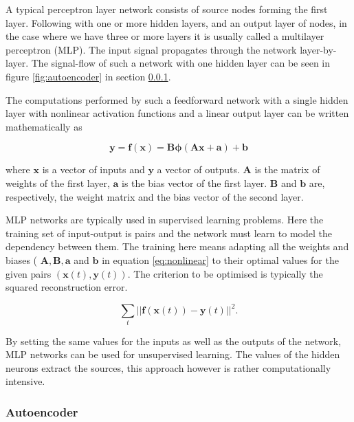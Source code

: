 A typical perceptron layer network consists of source nodes forming the first layer. Following with one or more hidden layers, and an output layer of nodes, in the case where we have three or more layers it is usually called a multilayer perceptron (MLP). The input signal propagates through the network layer-by-layer. The signal-flow of such a network with one hidden layer can be seen in figure \ref{fig:autoencoder} in section \ref{sec:autoencoders}.

The computations performed by such a feedforward network with a single hidden layer with nonlinear activation functions and a linear output layer can be written mathematically as

\begin{equation}
\mathbf{y}= \mathbf{f}(\mathbf{x}) = \mathbf{B}\boldsymbol{\phi}( \mathbf{A}\mathbf{x}+ \mathbf{a} ) + \mathbf{b}
\label{eq:nonlinear}
\end{equation}

where  $\mathbf{x}$ is a vector of inputs and  $\mathbf{y}$ a vector of outputs.  $ \mathbf{A}$ is the matrix of weights of the first layer,  $ \mathbf{a}$ is the bias vector of the first layer.  $ \mathbf{B}$ and  $ \mathbf{b}$ are, respectively, the weight matrix and the bias vector of the second layer. 

MLP networks are typically used in supervised learning problems. Here the training set of input-output is pairs and the network must learn to model the dependency between them. The training here means adapting all the weights and biases ( $ \mathbf{A},
\mathbf{B}, \mathbf{a}$ and  $ \mathbf{b}$ in equation \ref{eq:nonlinear} to their optimal values for the given pairs  $ (\mathbf{x}(t), \mathbf{y}(t))$. The criterion to be optimised is typically the squared reconstruction error.

\begin{equation}
\label{eq:error}
\sum_t \vert\vert\mathbf{f}(\mathbf{x}(t)) - \mathbf{y}(t)\vert\vert^2.
\end{equation}

By setting the same values for the inputs as well as the outputs of the network, MLP networks can be used for unsupervised learning. The values of the hidden neurons extract the sources, this approach however is rather computationally intensive. \cite{hidden}

\subsubsection{Autoencoder}
\label{sec:autoencoders}

